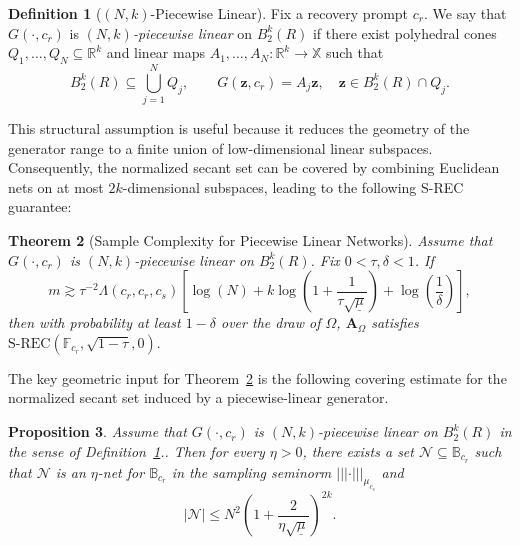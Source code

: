 \documentclass{article}
\theoremstyle{plain}
\newtheorem{theorem}{Theorem}[section]
\newtheorem{proposition}[theorem]{Proposition}
\theoremstyle{definition}
\newtheorem{definition}[theorem]{Definition}
\theoremstyle{remark}
\newcommand*{\snorm}[2]{\left\vert\!\left\vert\!\left\vert #1 \right\vert\!\right\vert\!\right\vert_{#2}}
\begin{document}
\begin{definition}[$(N,k)$-Piecewise Linear]
  \label{def:generator-structure}
  Fix a recovery prompt $c_r$.
  We say that $G\left(\cdot,c_r\right)$ is \emph{$(N,k)$-piecewise linear} on $B_2^k(R)$ if there exist polyhedral cones $Q_1,\dots,Q_{N}\subseteq \mathbb{R}^k$ and linear maps $A_1,\dots,A_{N}:\mathbb{R}^k\to\mathbb{X}$ such that
  \[
    B_2^k(R)
    \subseteq
    \bigcup_{j=1}^{N} Q_j,
    \qquad
    G\left(\mathbf z,c_r\right)=A_j\mathbf z,
    \quad
    \mathbf z\in B_2^k(R)\cap Q_j.
  \]
\end{definition}

This structural assumption is useful because it reduces the geometry of the generator range to a finite union of low-dimensional linear subspaces. Consequently, the normalized secant set can be covered by combining Euclidean nets on at most $2k$-dimensional subspaces, leading to the following S-REC guarantee:

\begin{theorem}[Sample Complexity for Piecewise Linear Networks]
  \label{thm:piecewise-linear-srec}
  Assume that $G\left(\cdot,c_r\right)$ is $(N,k)$-piecewise linear on $B_2^k(R)$. Fix $0<\tau,\delta<1$. If
  \[
    m
    \gtrsim
    \tau^{-2}
    \Lambda\left(c_r,c_r,c_s\right)
    \left[
      \log\left(N\right)
      +
      k\log\left(
        1+
        \frac{1}
        {\tau\sqrt{\underline{\mu}}}
      \right)
      +
      \log\left(\frac{1}{\delta}\right)
    \right],
  \]
  then with probability at least $1-\delta$ over the draw of $\Omega$, $\mathbf A_\Omega$ satisfies
  $
  \mathrm{S\text{-}REC}
  \left(
    \mathbb{F}_{c_r},
    \sqrt{1-\tau},
    0
  \right).
  $
\end{theorem}

The key geometric input for Theorem~\ref{thm:piecewise-linear-srec} is the following covering estimate for the normalized secant set induced by a piecewise-linear generator.

\begin{proposition}
  \label{prop:piecewise-linear-cover-transfer}
  Assume that $G(\cdot,c_r)$ is $(N,k)$-piecewise linear on
  $B_2^k(R)$ in the sense of Definition~\ref{def:generator-structure}.. Then for every $\eta>0$, there
  exists a set $\mathcal N\subseteq\mathbb B_{c_r}$ such that $\mathcal N$ is
  an $\eta$-net for $\mathbb B_{c_r}$ in the sampling seminorm
  $\snorm{\cdot}{\mu_{c_s}}$ and
  \[
    |\mathcal N|
    \leq
    N^2
    \left(
      1+
      \frac{2}
      {\eta\sqrt{\underline{\mu}}}
    \right)^{2k}.
  \]
\end{proposition}
\end{document}
